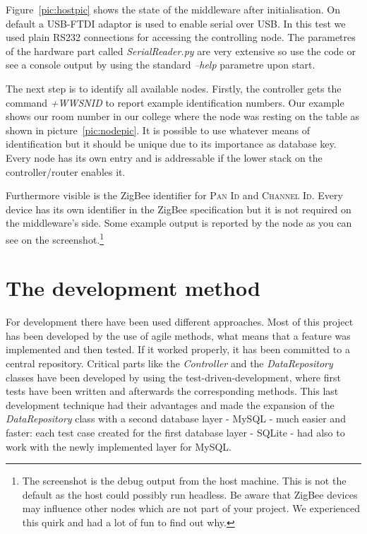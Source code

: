 Figure~\ref{pic:hostpic} shows the state of the middleware after initialisation. On default a USB-FTDI adaptor is used to enable serial over USB.
In this test we used plain RS232 connections for accessing the controlling node. The parametres of the hardware part called \textit{SerialReader.py}
are very extensive so use the code or see a console output by using the standard \textit{--help} parametre upon start.

The next step is to identify all available nodes. Firstly, the controller gets the command \textit{+WWSNID} to report example identification numbers.
Our example shows our room number in our college where the node was resting on the table as shown in picture~\ref{pic:nodepic}. It is possible 
to use whatever means of identification but it should be unique due to its importance as database key. Every node has its own 
entry and is addressable if the lower stack on the controller/router enables it.

Furthermore visible is the ZigBee identifier for \textsc{Pan Id} and \textsc{Channel Id}. Every device has its own identifier in the ZigBee specification
but it is not required on the middleware's side. Some example output is reported by the node as you can see on the screenshot.\footnote{The screenshot
    is the debug output from the host machine. This is not the default as the host could possibly run headless. Be aware that ZigBee devices may influence
other nodes which are not part of your project. We experienced this quirk and had a lot of fun to find out why.}

\newpage
\section{The development method}

For development there have been used different approaches. Most of this project has been developed by the use of agile methods, 
what means that a feature was implemented and then tested. If it worked properly, it has been committed to a central repository. 
Critical parts like the \textit{Controller} and the \textit{DataRepository} classes have been developed by using the test-driven-development, 
where first tests have been written and afterwards the corresponding methods. This last development technique had their advantages and made 
the expansion of the \textit{DataRepository} class with a second database layer - MySQL - much easier and faster: each test case 
created for the first database layer - SQLite - had also to work with the newly implemented layer for MySQL.

